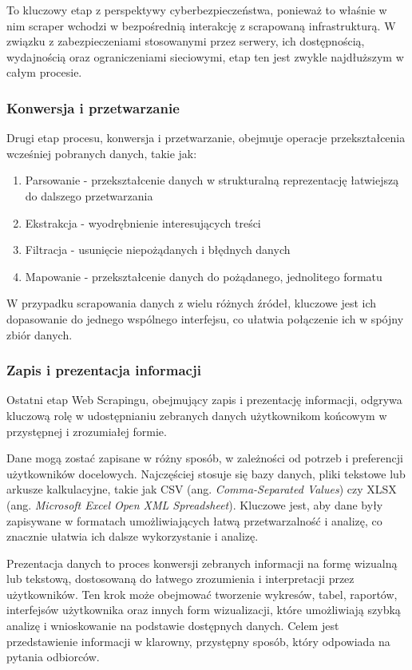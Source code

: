 To kluczowy etap z perspektywy cyberbezpieczeństwa, ponieważ to właśnie w nim scraper wchodzi w bezpośrednią interakcję z scrapowaną infrastrukturą.
W związku z zabezpieczeniami stosowanymi przez serwery, ich dostępnością, wydajnością oraz ograniczeniami sieciowymi, etap ten jest zwykle najdłuższym w całym procesie.

\subsubsection{Konwersja i przetwarzanie}

Drugi etap procesu, konwersja i przetwarzanie, obejmuje operacje przekształcenia wcześniej pobranych danych, takie jak:
\begin{enumerate}
    \item Parsowanie - przekształcenie danych w strukturalną reprezentację łatwiejszą do dalszego przetwarzania
    \item Ekstrakcja - wyodrębnienie interesujących treści
    \item Filtracja - usunięcie niepożądanych i błędnych danych
    \item Mapowanie - przekształcenie danych do pożądanego, jednolitego formatu
\end{enumerate}

\noindent W przypadku scrapowania danych z wielu różnych źródeł, kluczowe jest ich dopasowanie do jednego wspólnego interfejsu, co ułatwia połączenie ich w spójny zbiór danych.

\subsubsection{Zapis i prezentacja informacji}

Ostatni etap Web Scrapingu, obejmujący zapis i prezentację informacji, odgrywa kluczową rolę w udostępnianiu zebranych danych użytkownikom końcowym w przystępnej i zrozumiałej formie\cite{iee-state-of-the-art}.

Dane mogą zostać zapisane w różny sposób, w zależności od potrzeb i preferencji użytkowników docelowych.
Najczęściej stosuje się bazy danych, pliki tekstowe lub arkusze kalkulacyjne, takie jak CSV (ang. \emph{Comma-Separated Values}) czy XLSX (ang. \emph{Microsoft Excel Open XML Spreadsheet}).
Kluczowe jest, aby dane były zapisywane w formatach umożliwiających łatwą przetwarzalność i analizę, co znacznie ułatwia ich dalsze wykorzystanie i analizę\cite{iee-state-of-the-art}.

Prezentacja danych to proces konwersji zebranych informacji na formę wizualną lub tekstową, dostosowaną do łatwego zrozumienia i interpretacji przez użytkowników.
Ten krok może obejmować tworzenie wykresów, tabel, raportów, interfejsów użytkownika oraz innych form wizualizacji, które umożliwiają szybką analizę i wnioskowanie na podstawie dostępnych danych.
Celem jest przedstawienie informacji w klarowny, przystępny sposób, który odpowiada na pytania odbiorców.

